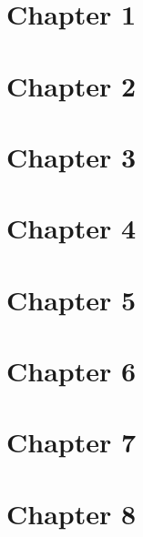 \documentclass{article}
\theoremstyle{definition}
\begin{document}

\section{Chapter 1}





\section{Chapter 2}





\section{Chapter 3}

\newpage

\newpage

\newpage
\section{Chapter 4}




\section{Chapter 5}



\section{Chapter 6}







\section{Chapter 7}




\section{Chapter 8}
\end{document}
